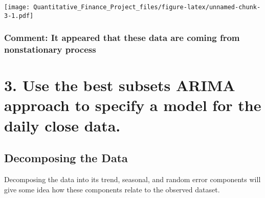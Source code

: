 \documentclass[
]{article}
\newenvironment{Shaded}{\begin{snugshade}}{\end{snugshade}}
\newcommand{\AttributeTok}[1]{\textcolor[rgb]{0.13,0.29,0.53}{#1}}
\newcommand{\CommentTok}[1]{\textcolor[rgb]{0.56,0.35,0.01}{\textit{#1}}}
\newcommand{\DecValTok}[1]{\textcolor[rgb]{0.00,0.00,0.81}{#1}}
\newcommand{\FunctionTok}[1]{\textcolor[rgb]{0.13,0.29,0.53}{\textbf{#1}}}
\newcommand{\NormalTok}[1]{#1}
\newcommand{\OtherTok}[1]{\textcolor[rgb]{0.56,0.35,0.01}{#1}}
\newcommand{\SpecialCharTok}[1]{\textcolor[rgb]{0.81,0.36,0.00}{\textbf{#1}}}
\newcommand{\StringTok}[1]{\textcolor[rgb]{0.31,0.60,0.02}{#1}}
\begin{document}
\begin{Shaded}
\end{Shaded}

\texttt{[image: Quantitative\_Finance\_Project\_files/figure-latex/unnamed-chunk-3-1.pdf]}

\hypertarget{comment-it-appeared-that-these-data-are-coming-from-nonstationary-process}{%
\subsubsection{Comment: It appeared that these data are coming from
nonstationary
process}\label{comment-it-appeared-that-these-data-are-coming-from-nonstationary-process}}

\hypertarget{use-the-best-subsets-arima-approach-to-specify-a-model-for-the-daily-close-data.}{%
\section{3. Use the best subsets ARIMA approach to specify a model for
the daily close
data.}\label{use-the-best-subsets-arima-approach-to-specify-a-model-for-the-daily-close-data.}}

\hypertarget{decomposing-the-data}{%
\subsection{Decomposing the Data}\label{decomposing-the-data}}

Decomposing the data into its trend, seasonal, and random error
components will give some idea how these components relate to the
observed dataset.
\end{document}
